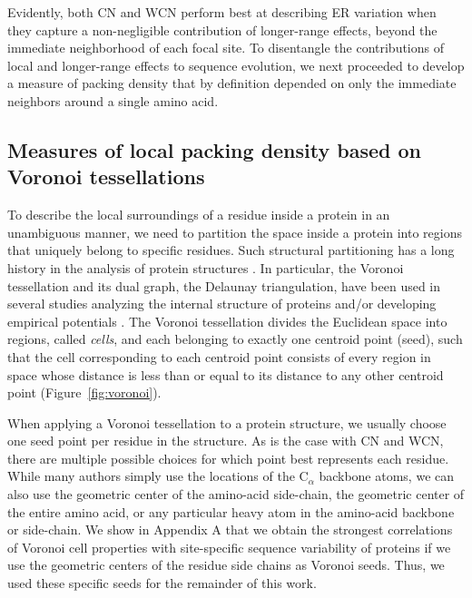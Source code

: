 \documentclass[12pt]{article}
\begin{document}
Evidently, both CN and WCN perform best at describing ER variation when they capture a non-negligible contribution of longer-range effects, beyond the immediate neighborhood of each focal site. To disentangle the contributions of local and longer-range effects to sequence evolution, we next proceeded to develop a measure of packing density that by definition depended on only the immediate neighbors around a single amino acid.


\subsection*{Measures of local packing density based on Voronoi tessellations}

To describe the local surroundings of a residue inside a protein in an unambiguous manner, we need to partition the space inside a protein into regions that uniquely belong to specific residues. Such structural partitioning has a long history in the analysis of protein structures \cite{richards_interpretation_1974, gerstein_volume_1994}. In particular, the Voronoi tessellation and its dual graph, the Delaunay triangulation, have been used in several studies analyzing the internal structure of proteins and/or developing empirical potentials \cite{zomorodian_geometric_2006, zhou_alpha_2014, xia_identifying_2014}. 
The Voronoi tessellation divides the Euclidean space into regions, called {\it cells}, and each belonging to exactly one centroid point (seed), such that the cell corresponding to each centroid point consists of every region in space whose distance is less than or equal to its distance to any other centroid point (Figure~\ref{fig:voronoi}).

When applying a Voronoi tessellation to a protein structure, we usually choose one seed point per residue in the structure. As is the case with CN and WCN, there are multiple possible choices for which point best represents each residue. While many authors simply use the locations of the C$_\alpha$ backbone atoms, we can also use the geometric center of the amino-acid side-chain, the geometric center of the entire amino acid, or any particular heavy atom in the amino-acid backbone or side-chain. We show in Appendix A that we obtain the strongest correlations of Voronoi cell properties with site-specific sequence variability of proteins if we use the geometric centers of the residue side chains as Voronoi seeds. Thus, we used these specific seeds for the remainder of this work.
\end{document}

